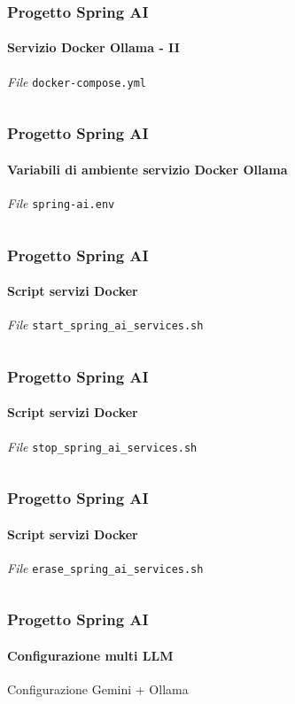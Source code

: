 %
\begin{frame}[t,fragile] \frametitle{Progetto Spring AI}
    \framesubtitle{Servizio Docker Ollama - II}
        \begin{block}{\textit{File} \texttt{docker-compose.yml}}
			{\tiny\inputminted{yaml}{code/docker-compose-2.yml}}
    	\end{block}
\end{frame}
%
\begin{frame}[t,fragile] \frametitle{Progetto Spring AI}
    \framesubtitle{Variabili di ambiente servizio Docker Ollama}
        \begin{block}{\textit{File} \texttt{spring-ai.env}}
			{\tiny\inputminted{text}{code/spring-ai.env}}
    	\end{block}
\end{frame}
%
\begin{frame}[t,fragile] \frametitle{Progetto Spring AI}
    \framesubtitle{Script servizi Docker}
        \begin{block}{\textit{File} \texttt{start\_spring\_ai\_services.sh}}
			{\tiny\inputminted{bash}{code/start_spring_ai_services.sh}}
    	\end{block}

\end{frame}
%
\begin{frame}[t,fragile] \frametitle{Progetto Spring AI}
    \framesubtitle{Script servizi Docker}
        \begin{block}{\textit{File} \texttt{stop\_spring\_ai\_services.sh}}
			{\tiny\inputminted{bash}{code/stop_spring_ai_services.sh}}
    	\end{block}
\end{frame}
%
\begin{frame}[t,fragile] \frametitle{Progetto Spring AI}
    \framesubtitle{Script servizi Docker}
        \begin{block}{\textit{File} \texttt{erase\_spring\_ai\_services.sh}}
			{\tiny\inputminted{bash}{code/erase_spring_ai_services.sh}}
    	\end{block}

\end{frame}
%
\begin{frame}[t,fragile] \frametitle{Progetto Spring AI}
    \framesubtitle{Configurazione multi LLM}
        \vspace*{-.7cm}
        \begin{block}{Configurazione Gemini + Ollama}
			{\tiny\inputminted{java}{code/ChatClientConfig.java}}
    	\end{block}

\end{frame}
